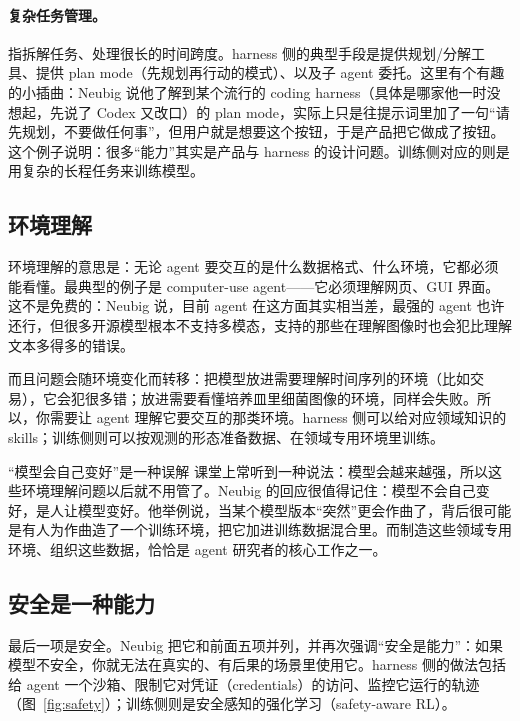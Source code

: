 \documentclass[a4paper]{article}
\begin{document}
\paragraph{复杂任务管理。}指拆解任务、处理很长的时间跨度。harness 侧的典型手段是提供规划/分解工具、提供 plan mode（先规划再行动的模式）、以及子 agent 委托。这里有个有趣的小插曲：Neubig 说他了解到某个流行的 coding harness（具体是哪家他一时没想起，先说了 Codex 又改口）的 plan mode，实际上只是往提示词里加了一句“请先规划，不要做任何事”，但用户就是想要这个按钮，于是产品把它做成了按钮。这个例子说明：很多“能力”其实是产品与 harness 的设计问题。训练侧对应的则是用复杂的长程任务来训练模型。

\subsection{环境理解}

环境理解的意思是：无论 agent 要交互的是什么数据格式、什么环境，它都必须能看懂。最典型的例子是 computer-use agent——它必须理解网页、GUI 界面。这不是免费的：Neubig 说，目前 agent 在这方面其实相当差，最强的 agent 也许还行，但很多开源模型根本不支持多模态，支持的那些在理解图像时也会犯比理解文本多得多的错误。

而且问题会随环境变化而转移：把模型放进需要理解时间序列的环境（比如交易），它会犯很多错；放进需要看懂培养皿里细菌图像的环境，同样会失败。所以，你需要让 agent 理解它要交互的那类环境。harness 侧可以给对应领域知识的 skills；训练侧则可以按观测的形态准备数据、在领域专用环境里训练。

\begin{warningbox}{“模型会自己变好”是一种误解}
课堂上常听到一种说法：模型会越来越强，所以这些环境理解问题以后就不用管了。Neubig 的回应很值得记住：模型不会自己变好，是人让模型变好。他举例说，当某个模型版本“突然”更会作曲了，背后很可能是有人为作曲造了一个训练环境，把它加进训练数据混合里。而制造这些领域专用环境、组织这些数据，恰恰是 agent 研究者的核心工作之一。
\end{warningbox}

\subsection{安全是一种能力}

最后一项是安全。Neubig 把它和前面五项并列，并再次强调“安全是能力”：如果模型不安全，你就无法在真实的、有后果的场景里使用它。harness 侧的做法包括给 agent 一个沙箱、限制它对凭证（credentials）的访问、监控它运行的轨迹（图~\ref{fig:safety}）；训练侧则是安全感知的强化学习（safety-aware RL）。
\end{document}
